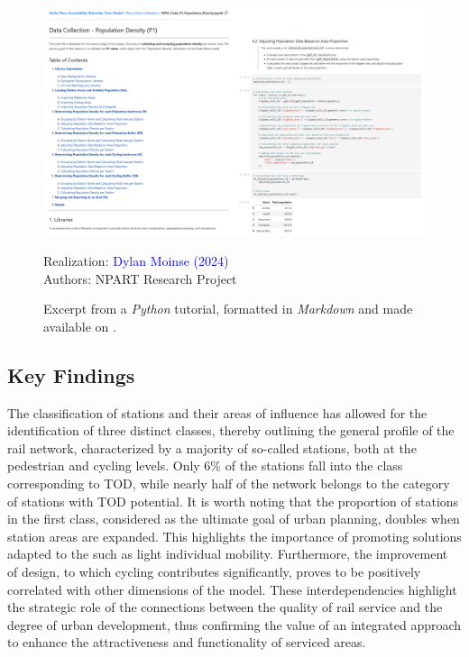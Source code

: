 \begin{refsegment}
\begin{figure}[h!]\vspace*{4pt}
    \caption{Excerpt from a \textsl{Python} tutorial, formatted in \textsl{Markdown} and made available on .}
    \label{fig-chap6:screen-github-2}
    \centerline{\includegraphics[width=1\columnwidth]{src/Figures/Chap-6/EN_EN_NPART_Screen_Github_2.png}}
    \vspace{5pt}
    \begin{flushright}\scriptsize{
    Realization: \textcolor{blue}{Dylan Moinse (2024)}
    \\
    Authors: \acrshort{NPART} Research Project
    }\end{flushright}
\end{figure}

\subsection*{Key Findings
    \label{chap6:principaux-enseignements}
    }

The classification of stations and their areas of influence has allowed for the identification of three distinct classes, thereby outlining the general profile of the rail network, characterized by a majority of so-called  stations, both at the pedestrian and cycling levels. Only 6\% of the stations fall into the class corresponding to \acrshort{TOD}, while nearly half of the network belongs to the category of stations with \acrshort{TOD} potential. It is worth noting that the proportion of stations in the first class, considered as the ultimate goal of urban planning, doubles when station areas are expanded. This highlights the importance of promoting solutions adapted to the  such as light individual mobility. Furthermore, the improvement of design, to which cycling contributes significantly, proves to be positively correlated with other dimensions of the model. These interdependencies highlight the strategic role of the connections between the quality of rail service and the degree of urban development, thus confirming the value of an integrated approach to enhance the attractiveness and functionality of serviced areas.%


\end{refsegment}

